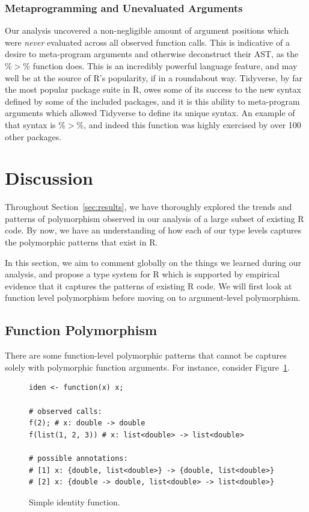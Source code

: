 \documentclass[acmsmall,10pt,review,anonymous]{acmart}\settopmatter{printfolios=true,printccs=false,printacmref=false}
\begin{document}
%
%
%
%
\subsubsection{Metaprogramming and Unevaluated Arguments}

Our analysis uncovered a non-negligible amount of argument positions which were {\it never} evaluated across all observed function calls.
This is indicative of a desire to meta-program arguments and otherwise deconstruct their AST, as the \%$>$\% function does.
This is an incredibly powerful language feature, and may well be at the source of R's popularity, if in a roundabout way.
Tidyverse, by far the most popular package suite in R, owes some of its success to the new syntax defined by some of the included packages, and it is this ability to meta-program arguments which allowed Tidyverse to define its unique syntax.
An example of that syntax is \%$>$\%, and indeed this function was highly exercised by over 100 other packages.

%
%  
%
%
%
%
\section{Discussion}

Throughout Section~\ref{sec:results}, we have thoroughly explored the trends and patterns of polymorphism observed in our analysis of a large subset of existing R code.
By now, we have an understanding of how each of our type levels captures the polymorphic patterns that exist in R.

In this section, we aim to comment globally on the things we learned during our analysis, and propose a type system for R which is supported by empirical evidence that it captures the patterns of existing R code.
We will first look at function level polymorphism before moving on to argument-level polymorphism.

%
%
%
%
\subsection{Function Polymorphism}

There are some function-level polymorphic patterns that cannot be captures solely with polymorphic function arguments.
For instance, consider Figure~\ref{fig:funanno}.

\begin{figure}[!hb]{\small\begin{lstlisting}[style=R]
iden <- function(x) x;

# observed calls:
f(2); # x: double -> double
f(list(1, 2, 3)) # x: list<double> -> list<double>

# possible annotations:
# [1] x: {double, list<double>} -> {double, list<double>}
# [2] x: {double -> double, list<double> -> list<double>}
\end{lstlisting}}\caption{Simple identity function.}\label{fig:funanno}\end{figure}
\end{document}
